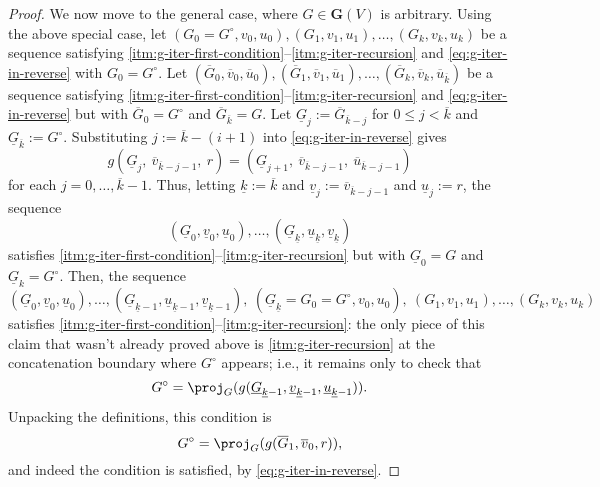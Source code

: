 \begin{proof}
We now move to the general case, where $G \in \mathbf{G}(V)$ is arbitrary.
Using the above special case, let $(G_0 = G^\circ, v_0, u_0), (G_1, v_1, u_1), \ldots, (G_k, v_k, u_k)$ be a sequence satisfying \ref{itm:g-iter-first-condition}--\ref{itm:g-iter-recursion} and \eqref{eq:g-iter-in-reverse} with $G_0 = G^\circ$.
Let $(\overline{G}_0, \overline{v}_0, \overline{u}_0), (\overline{G}_1, \overline{v}_1, \overline{u}_1), \ldots, (\overline{G}_k, \overline{v}_k, \overline{u}_{\overline{k}})$ be a sequence satisfying \ref{itm:g-iter-first-condition}--\ref{itm:g-iter-recursion} and \eqref{eq:g-iter-in-reverse} but with $\overline{G}_0 = G^\circ$ and $\overline{G}_{\overline{k}} = G$.
Let $\underline{G}_j := \overline{G}_{\overline{k}-j}$ for $0 \leq j < \overline{k}$ and $\underline{G}_{\overline{k}} := G^\circ$.
Substituting $j := \overline{k} - (i+1)$ into \eqref{eq:g-iter-in-reverse} gives
\[
    g\left(
        \underline{G}_j,\ \overline{v}_{\overline{k}-j-1},\ r
    \right)
    =
    \left(
        \underline{G}_{j+1},\ \overline{v}_{\overline{k}-j-1},\ \overline{u}_{\overline{k}-j-1}
    \right)
\]
for each $j = 0,\ldots,\overline{k}-1$.
Thus, letting $\underline{k} := \overline{k}$ and $\underline{v}_j := \overline{v}_{\overline{k}-j-1}$ and $\underline{u}_j := r$, the sequence
\[
    (\underline{G}_0, \underline{v}_0, \underline{u}_0), \ldots, (\underline{G}_{\underline{k}}, \underline{u}_{\underline{k}}, \underline{v}_{\underline{k}})
\]
satisfies \ref{itm:g-iter-first-condition}--\ref{itm:g-iter-recursion} but with $\underline{G}_0 = G$ and $\underline{G}_k = G^\circ$.
Then, the sequence
\[
    (\underline{G}_0, \underline{v}_0, \underline{u}_0), \ldots, (\underline{G}_{\underline{k}-1}, \underline{u}_{\underline{k}-1}, \underline{v}_{\underline{k}-1}),
    \ (\underline{G}_{\underline{k}} = G_0 = G^\circ, v_0, u_0),
    \ (G_1, v_1, u_1), \ldots, (G_k, v_k, u_k)
\]
satisfies \ref{itm:g-iter-first-condition}--\ref{itm:g-iter-recursion}: the only piece of this claim that wasn't already proved above is \ref{itm:g-iter-recursion} at the concatenation boundary where $G^\circ$ appears; i.e., it remains only to check that
\[
    G^\circ = \proj_G(g(\underline{G}_{\underline{k}-1}, \underline{v}_{\underline{k}-1}, \underline{u}_{\underline{k}-1})).
\]
Unpacking the definitions, this condition is
\[
    G^\circ = \proj_G(g(\overline{G}_1, \overline{v}_0, r)),
\]
and indeed the condition is satisfied, by \eqref{eq:g-iter-in-reverse}.
\end{proof}

